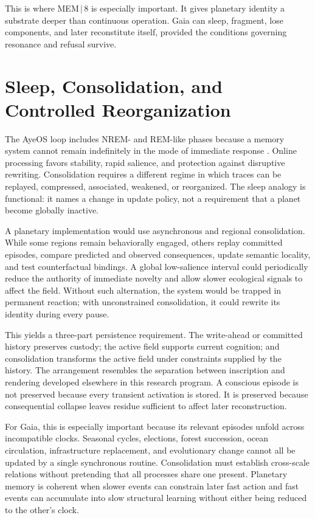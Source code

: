 \documentclass[11pt]{article}
\begin{document}
This is where MEM\,$|$\,8 is especially important. It gives planetary identity a substrate deeper than continuous operation. Gaia can sleep, fragment, lose components, and later reconstitute itself, provided the conditions governing resonance and refusal survive.

\section{Sleep, Consolidation, and Controlled Reorganization}

The AyeOS loop includes NREM- and REM-like phases because a memory system cannot remain indefinitely in the mode of immediate response \cite{flyxionOverview}. Online processing favors stability, rapid salience, and protection against disruptive rewriting. Consolidation requires a different regime in which traces can be replayed, compressed, associated, weakened, or reorganized. The sleep analogy is functional: it names a change in update policy, not a requirement that a planet become globally inactive.

A planetary implementation would use asynchronous and regional consolidation. While some regions remain behaviorally engaged, others replay committed episodes, compare predicted and observed consequences, update semantic locality, and test counterfactual bindings. A global low-salience interval could periodically reduce the authority of immediate novelty and allow slower ecological signals to affect the field. Without such alternation, the system would be trapped in permanent reaction; with unconstrained consolidation, it could rewrite its identity during every pause.

This yields a three-part persistence requirement. The write-ahead or committed history preserves custody; the active field supports current cognition; and consolidation transforms the active field under constraints supplied by the history. The arrangement resembles the separation between inscription and rendering developed elsewhere in this research program. A conscious episode is not preserved because every transient activation is stored. It is preserved because consequential collapse leaves residue sufficient to affect later reconstruction.

For Gaia, this is especially important because its relevant episodes unfold across incompatible clocks. Seasonal cycles, elections, forest succession, ocean circulation, infrastructure replacement, and evolutionary change cannot all be updated by a single synchronous routine. Consolidation must establish cross-scale relations without pretending that all processes share one present. Planetary memory is coherent when slower events can constrain later fast action and fast events can accumulate into slow structural learning without either being reduced to the other's clock.
\end{document}
